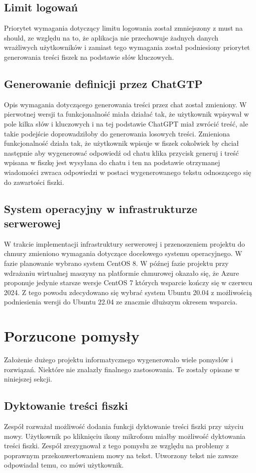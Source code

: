 \subsection{Limit logowań}
Priorytet wymagania dotyczący limitu logowania został zmniejszony z must na should, ze względu na to, że aplikacja nie przechowuje żadnych danych wrażliwych użytkowników i zamiast tego wymagania został podniesiony priorytet generowania treści fiszek na podstawie słów kluczowych.

\subsection{Generowanie definicji przez ChatGTP}
Opis wymagania dotyczącego generowania treści przez chat został zmieniony. W pierwotnej wersji ta funkcjonalność miała działać tak, że użytkownik wpisywał w pole kilka słów i kluczowych i na tej podstawie ChatGPT miał zwrócić treść, ale takie podejście doprowadziłoby do generowania losowych treści. Zmieniona funkcjonalność działa tak, że użytkownik wpisuje w fiszek cokolwiek by chciał następnie aby wygenerować odpowiedź od chatu klika przycisk generuj i treść wpisana w fiszkę jest wysyłana do chatu i ten na podstawie otrzymanej wiadomości zwraca odpowiedzi w postaci wygenerowanego tekstu odnoszącego się do zawartości fiszki.

\subsection{System operacyjny w infrastrukturze serwerowej}
W trakcie implementacji infrastruktury serwerowej i przenoszeniem projektu do chmury zmieniono wymagania dotyczące docelowego systemu operacyjnego. W fazie planowanie wybrano system CentOS 8. W późnej fazie projektu przy wdrażaniu wirtualnej maszyny na platformie chmurowej okazało się, że Azure proponuje jedynie starsze wersje CentOS 7 których wsparcie kończy się w czerwcu 2024. Z tego powodu zdecydowano się wybrać system Ubuntu 20.04 z możliwością podniesienia wersji do Ubuntu 22.04 ze znacznie dłuższym okresem wsparcia.


\section{Porzucone pomysły}
Założenie dużego projektu informatycznego wygenerowało wiele pomysłów i rozwiązań. Niektóre nie znalazły finalnego zastosowania. Te zostały opisane w niniejszej sekcji.

\subsection{Dyktowanie treści fiszki}
Zespół rozważał możliwość dodania funkcji dyktowanie treści fiszki przy użyciu mowy. Użytkownik po kliknięciu ikony mikrofonu miałby możliwość dyktowania treści fiszki. Zespół zrezygnował z tego pomysłu ze względu na problemy z poprawnym przekonwertowaniem mowy na tekst. Utworzony tekst nie zawsze odpowiadał temu, co mówi użytkownik.

